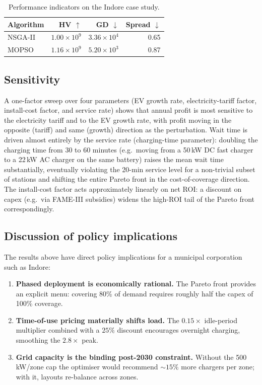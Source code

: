 \documentclass[conference]{IEEEtran}
\begin{document}
\begin{table}[t]
  \centering
  \caption{Performance indicators on the Indore case study.}
  \label{tab:indicators}
  \begin{tabular}{lrrr}
    \toprule
    Algorithm & HV $\uparrow$ & GD $\downarrow$ & Spread $\downarrow$ \\
    \midrule
    NSGA-II   & $1.00\!\times\!10^{9}$  & $3.36\!\times\!10^{4}$ & 0.65 \\
    MOPSO     & $1.16\!\times\!10^{9}$  & $5.20\!\times\!10^{3}$ & 0.87 \\
    \bottomrule
  \end{tabular}
\end{table}

\subsection{Sensitivity}
\label{subsec:sensitivity}
A one-factor sweep over four parameters (EV growth rate,
electricity-tariff factor, install-cost factor, and service rate)
shows that annual profit is most sensitive to the electricity
tariff and to the EV growth rate, with profit moving in the
opposite (tariff) and same (growth) direction as the perturbation.
Wait time is driven almost entirely by the service rate
(charging-time parameter): doubling the charging time from 30 to
60 minutes (e.g.\ moving from a 50\,kW DC fast charger to a 22\,kW
AC charger on the same battery) raises the mean wait time
substantially, eventually violating the 20-min service level for a
non-trivial subset of stations and shifting the entire Pareto
front in the cost-of-coverage direction. The install-cost factor
acts approximately linearly on net ROI: a discount on capex
(e.g.\ via FAME-III subsidies) widens the high-ROI tail of the
Pareto front correspondingly.

\subsection{Discussion of policy implications}
\label{subsec:discussion}
The results above have direct policy implications for a municipal
corporation such as Indore:
\begin{enumerate}
\item \textbf{Phased deployment is economically rational.} The Pareto
      front provides an explicit menu: covering 80\% of demand
      requires roughly half the capex of 100\% coverage.
\item \textbf{Time-of-use pricing materially shifts load.} The
      $0.15\times$ idle-period multiplier combined with a
      $25\%$ discount encourages overnight charging, smoothing the
      $2.8\times$ peak.
\item \textbf{Grid capacity is the binding post-2030 constraint.}
      Without the 500\,kW/zone cap the optimiser would recommend
      $\sim 15\%$ more chargers per zone; with it, layouts re-balance
      across zones.
\end{enumerate}
\end{document}
